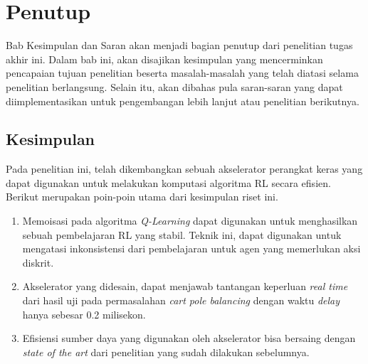 \chapter{Penutup}

Bab Kesimpulan dan Saran akan menjadi bagian penutup dari penelitian tugas akhir ini. Dalam bab ini, akan disajikan kesimpulan yang mencerminkan pencapaian tujuan penelitian beserta masalah-masalah yang telah diatasi selama penelitian berlangsung. Selain itu, akan dibahas pula saran-saran yang dapat diimplementasikan untuk pengembangan lebih lanjut atau penelitian berikutnya.

\section{Kesimpulan}

Pada penelitian ini, telah dikembangkan sebuah akselerator perangkat keras yang dapat digunakan untuk melakukan komputasi algoritma \ac{RL} secara efisien. Berikut merupakan poin-poin utama dari kesimpulan riset ini.

\begin{enumerate}
	\item Memoisasi pada algoritma \textit{Q-Learning} dapat digunakan untuk menghasilkan sebuah pembelajaran \ac{RL} yang stabil. Teknik ini, dapat digunakan untuk mengatasi inkonsistensi dari pembelajaran untuk agen yang memerlukan aksi diskrit.
	\item Akselerator yang didesain, dapat menjawab tantangan keperluan \textit{real time} dari hasil uji pada permasalahan \textit{cart pole balancing} dengan waktu \textit{delay} hanya sebesar 0.2 milisekon.
	\item Efisiensi sumber daya yang digunakan oleh akselerator bisa bersaing dengan \textit{state of the art} dari penelitian yang sudah dilakukan sebelumnya.
\end{enumerate}

